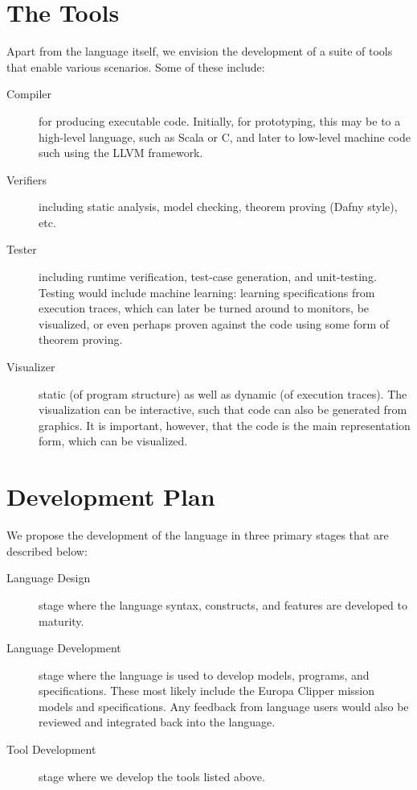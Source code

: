 \documentclass{llncs}
\begin{document}
\section{The Tools}

Apart from the language itself, we envision the development of a suite of tools that enable various scenarios. Some of these include: 

\begin{description}

  \item [Compiler] for producing executable code. Initially, for
    prototyping, this may be to a high-level language, such as Scala
    or C, and later to low-level machine code such using the LLVM
    framework.

  \item [Verifiers] including static analysis, model checking, theorem
    proving (Dafny style), etc.
    
  \item [Tester] including runtime verification, test-case generation,
    and unit-testing. Testing would include machine learning: learning
    specifications from execution traces, which can later be turned
    around to monitors, be visualized, or even perhaps proven against
    the code using some form of theorem proving.
    
  \item [Visualizer] static (of program structure) as well as dynamic
    (of execution traces). The visualization can be interactive, such
    that code can also be generated from graphics.  It is important,
    however, that the code is the main representation form, which can
    be visualized.

\end{description}

\section{Development Plan}

We propose the development of the language in three primary stages that
are described below:

\begin{description}

\item [Language Design] stage where the language syntax, constructs,
  and features are developed to maturity. 

\item [Language Development] stage where the language is used to
  develop models, programs, and specifications. These most likely
  include the Europa Clipper mission models and specifications. Any
  feedback from language users would also be reviewed and integrated
  back into the language.

\item [Tool Development] stage where we develop the tools listed above. 

\end{description}

%
%
\end{document}
